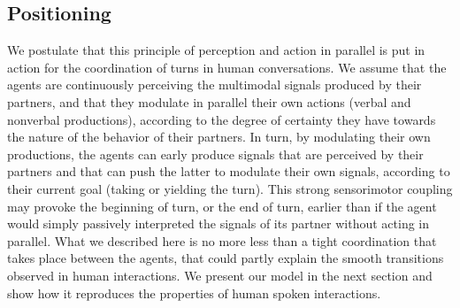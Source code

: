 
\subsection{Positioning}

We postulate that this principle of perception and
action in parallel is put in action for the coordination
of turns in human conversations. We assume that the
agents are continuously perceiving the multimodal signals
produced by their partners, and that they modulate
in parallel their own actions (verbal and nonverbal
productions), according to the degree of certainty they
have towards the nature of the behavior of their partners.
In turn, by modulating their own productions, the
agents can early produce signals that are perceived by
their partners and that can push the latter to modulate
their own signals, according to their current goal
(taking or yielding the turn). This strong sensorimotor
coupling may provoke the beginning of turn, or the end
of turn, earlier than if the agent would simply passively
interpreted the signals of its partner without acting in
parallel. What we described here is no more less than a
tight coordination that takes place between the agents,
that could partly explain the smooth transitions observed
in human interactions. We present our model in
the next section and show how it reproduces the properties
of human spoken interactions.